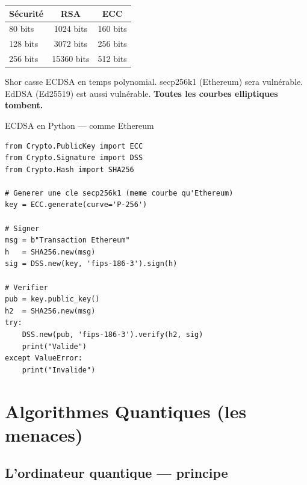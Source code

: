 \documentclass[12pt, a4paper]{article}
\begin{document}
\begin{center}
\renewcommand{\arraystretch}{1.4}
\begin{tabular}{lcc}
  \toprule
  \textbf{Sécurité} & \textbf{RSA} & \textbf{ECC} \\
  \midrule
  80 bits & 1024 bits & 160 bits \\
  128 bits & 3072 bits & 256 bits \\
  256 bits & 15360 bits & 512 bits \\
  \bottomrule
\end{tabular}
\end{center}

\begin{danger}
Shor casse ECDSA en temps polynomial. secp256k1 (Ethereum) sera vulnérable.
EdDSA (Ed25519) est aussi vulnérable. \textbf{Toutes les courbes elliptiques tombent.}
\end{danger}

\begin{pratique}{ECDSA en Python --- comme Ethereum}
\begin{lstlisting}[style=python]
from Crypto.PublicKey import ECC
from Crypto.Signature import DSS
from Crypto.Hash import SHA256

# Generer une cle secp256k1 (meme courbe qu'Ethereum)
key = ECC.generate(curve='P-256')

# Signer
msg = b"Transaction Ethereum"
h   = SHA256.new(msg)
sig = DSS.new(key, 'fips-186-3').sign(h)

# Verifier
pub = key.public_key()
h2  = SHA256.new(msg)
try:
    DSS.new(pub, 'fips-186-3').verify(h2, sig)
    print("Valide")
except ValueError:
    print("Invalide")
\end{lstlisting}
\end{pratique}

\section{Algorithmes Quantiques (les menaces)}

\subsection{L'ordinateur quantique --- principe}
\end{document}
